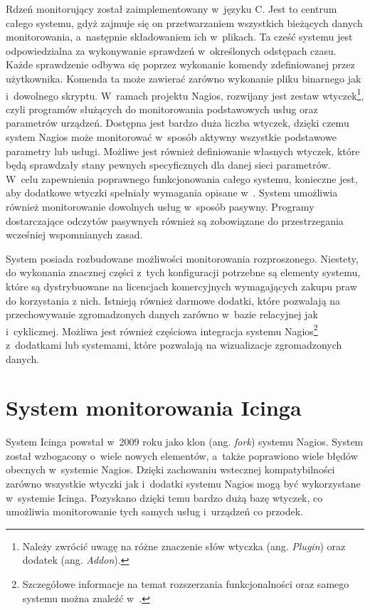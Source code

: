 Rdzeń monitorujący został zaimplementowany w~języku C. Jest to centrum
całego systemu, gdyż zajmuje się on przetwarzaniem wszystkich
bieżących danych monitorowania, a~następnie składowaniem ich
w~plikach. Ta cześć systemu jest odpowiedzialna za wykonywanie
sprawdzeń w~określonych odstępach czasu. Każde sprawdzenie odbywa się
poprzez wykonanie komendy zdefiniowanej przez użytkownika. Komenda ta
może zawierać zarówno wykonanie pliku binarnego jak i~dowolnego
skryptu. W~ramach projektu Nagios, rozwijany jest zestaw
wtyczek\footnote{Należy zwrócić uwagę na różne znaczenie słów wtyczka
  (ang. {\em Plugin}) oraz dodatek (ang. {\em Addon}). }, czyli
programów służących do monitorowania podstawowych usług oraz
parametrów urządzeń. Dostępna jest bardzo duża liczba wtyczek, dzięki
czemu system Nagios może monitorować w~sposób aktywny wszystkie
podstawowe parametry lub usługi. Możliwe jest również definiowanie
własnych wtyczek, które będą sprawdzały stany pewnych specyficznych
dla danej sieci parametrów. W~celu zapewnienia poprawnego
funkcjonowania całego systemu, konieczne jest, aby dodatkowe wtyczki
spełniały wymagania opisane w~\cite{www:NagiosPluginsTutorial}. System
umożliwia również monitorowanie dowolnych usług w~sposób
pasywny. Programy dostarczające odczytów pasywnych również są
zobowiązane do przestrzegania wcześniej wspomnianych zasad.

System posiada rozbudowane możliwości monitorowania
rozproszonego. Niestety, do wykonania znacznej części z~tych
konfiguracji potrzebne są elementy systemu, które są dystrybuowane na
licencjach komercyjnych wymagających zakupu praw do korzystania z
nich. Istnieją również darmowe dodatki, które pozwalają na
przechowywanie zgromadzonych danych zarówno w~bazie relacyjnej jak
i~cyklicznej. Możliwa jest również częściowa integracja systemu
Nagios\footnote{Szczegółowe informacje na temat rozszerzania
  funkcjonalności oraz samego systemu można znaleźć
  w~\cite{www:Nagios}.}  z~dodatkami lub systemami, które pozwalają na
wizualizacje zgromadzonych danych.

\section[Icinga][System monitorowania Icinga]{System monitorowania Icinga}
\label{subsec:Icinga}

System Icinga powstał w~2009 roku jako klon (ang. {\em fork}) systemu
Nagios. System został wzbogacony o~wiele nowych elementów, a~także
poprawiono wiele błędów obecnych w~systemie Nagios. Dzięki zachowaniu
wstecznej kompatybilności zarówno wszystkie wtyczki jak i~dodatki
systemu Nagios mogą być wykorzystane w~systemie Icinga. Pozyskano
dzięki temu bardzo dużą bazę wtyczek, co umożliwia monitorowanie tych
samych usług i~urządzeń co przodek.

